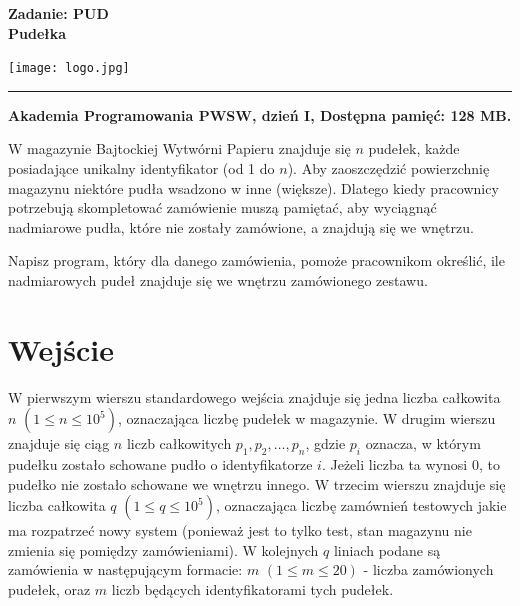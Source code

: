 \documentclass[10pt]{article}
\begin{document}
    

    \noindent
    \begin{minipage}{0.5\textwidth}
        \LARGE{\textsf{\textbf{Zadanie: PUD\\Pudełka}}}
    \end{minipage}
    \begin{minipage}{0.5\textwidth}
        \begin{flushright}
            \texttt{[image: logo.jpg]}
        \end{flushright}
    \end{minipage}
    
    \noindent\rule{\textwidth}{0.4pt}
    
    \noindent\textbf{Akademia Programowania PWSW, dzień I, Dostępna pamięć: 128 MB.}
    \vspace{1em}
    
    
    \noindent
    W magazynie Bajtockiej Wytwórni Papieru znajduje się $n$ pudełek, każde posiadające unikalny identyfikator (od 1 do $n$). Aby zaoszczędzić powierzchnię magazynu niektóre pudła wsadzono w inne (większe). Dlatego kiedy pracownicy potrzebują skompletować zamówienie muszą pamiętać, aby wyciągnąć nadmiarowe pudła, które nie zostały zamówione, a znajdują się we wnętrzu.

    Napisz program, który dla danego zamówienia, pomoże pracownikom określić, ile nadmiarowych pudeł znajduje się we wnętrzu zamówionego zestawu.
    

    \section*{Wejście}
    
    W pierwszym wierszu standardowego wejścia znajduje się jedna liczba całkowita $n$ $(1\leq n\leq 10^{5})$, oznaczająca liczbę pudełek w magazynie. W drugim wierszu znajduje się ciąg $n$ liczb całkowitych $p_{1}, p_{2}, \ldots, p_{n}$, gdzie $p_{i}$ oznacza, w którym pudełku zostało schowane pudło o identyfikatorze $i$. Jeżeli liczba ta wynosi 0, to pudełko nie zostało schowane we wnętrzu innego. W trzecim wierszu znajduje się liczba całkowita $q$ $(1\leq q\leq 10^{5})$, oznaczająca liczbę zamównień testowych jakie ma rozpatrzeć nowy system (ponieważ jest to tylko test, stan magazynu nie zmienia się pomiędzy zamówieniami). W kolejnych $q$ liniach podane są zamówienia w następującym formacie: $m$ $(1 \leq m \leq 20)$ - liczba zamówionych pudełek, oraz $m$ liczb będących identyfikatorami tych pudełek.
\end{document}
